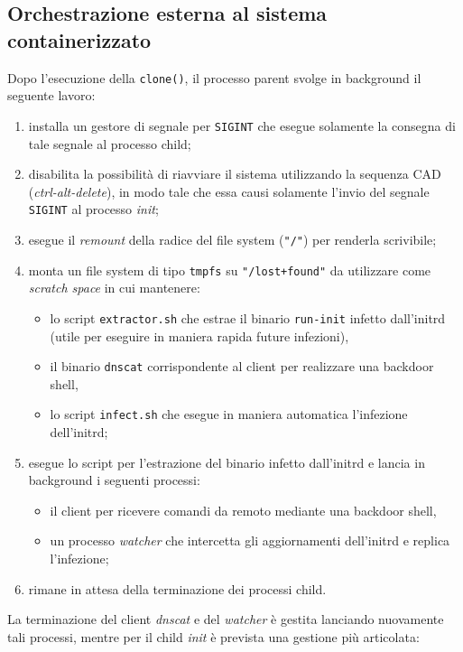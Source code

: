 \documentclass{article}
\begin{document}
\subsection{Orchestrazione esterna al sistema containerizzato}
Dopo l'esecuzione della \texttt{clone()}, il processo parent svolge in background il seguente lavoro:
\begin{enumerate}
	\item installa un gestore di segnale per \texttt{SIGINT} che esegue solamente la consegna di tale segnale al processo child;
	\item disabilita la possibilità di riavviare il sistema utilizzando la sequenza CAD (\textsl{ctrl-alt-delete}), in modo tale che essa causi solamente l'invio del segnale \texttt{SIGINT} al processo \textsl{init};
	\item esegue il \textsl{remount} della radice del file system (\texttt{"/"}) per renderla scrivibile;
	\item monta un file system di tipo \texttt{tmpfs} su \texttt{"/lost+found"} da utilizzare come \textsl{scratch space} in cui mantenere:
	\begin{itemize}
		\item lo script \texttt{extractor.sh} che estrae il binario \texttt{run-init} infetto dall'initrd (utile per eseguire in maniera rapida future infezioni),
		\item il binario \texttt{dnscat} corrispondente al client per realizzare una backdoor shell,
		\item lo script \texttt{infect.sh} che esegue in maniera automatica l'infezione dell'initrd;
	\end{itemize}
	\item esegue lo script per l'estrazione del binario infetto dall'initrd e lancia in background i seguenti processi:
	\begin{itemize}
		\item il client per ricevere comandi da remoto mediante una backdoor shell,
		\item un processo \textsl{watcher} che intercetta gli aggiornamenti dell'initrd e replica l'infezione;
	\end{itemize}
	\item rimane in attesa della terminazione dei processi child.
\end{enumerate}
La terminazione del client \textsl{dnscat} e del \textsl{watcher} è gestita lanciando nuovamente tali processi, mentre per il child \textsl{init} è prevista una gestione più articolata:
\end{document}
